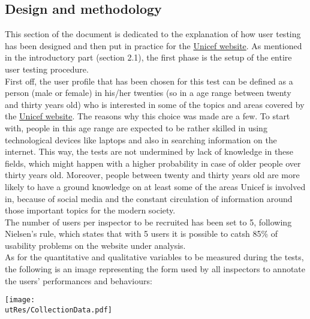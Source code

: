 
\subsection{Design and methodology}
This section of the document is dedicated to the explanation of how user testing has been designed and then put in practice for the \href{https://www.unicef.org/}{Unicef website}.
As mentioned in the introductory part (section 2.1), the first phase is the setup of the entire user testing procedure.\\
First off, the user profile that has been chosen for this test can be defined as a person (male or female) in his/her twenties (so in a age range between twenty and thirty years old) who is interested in some of the topics and areas covered by the \href{https://www.unicef.org/}{Unicef website}. The reasons why this choice was made are a few. To start with, people in this age range are expected to be rather skilled in using technological devices like laptops and also in searching information on the internet. This way, the tests are not undermined by lack of knowledge in these fields, which might happen with a higher probability in case of older people over thirty years old. Moreover, people between twenty and thirty years old are more likely to have a ground knowledge on at least some of the areas Unicef is involved in, because of social media and the constant circulation of information around those important topics for the modern society.\\
The number of users per inspector to be recruited has been set to 5, following Nielsen's rule, which states that with 5 users it is possible to catsh 85\% of usability problems on the website under analysis.\\
As for the quantitative and qualitative variables to be measured during the tests, the following is an image representing the form used by all inspectors to annotate the users' performances and behaviours:

\begin{center}
	\texttt{[image: \\utRes/CollectionData.pdf]}
\end{center}

